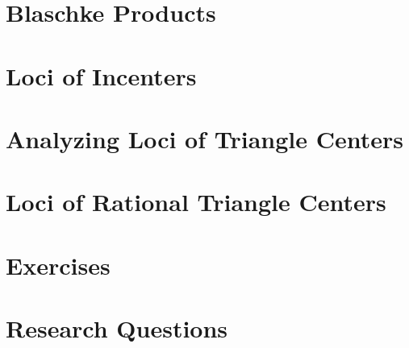 %

\section{Blaschke Products}
\label{sec:04-blaschke}


\section{Loci of Incenters}
\label{sec:04-proof_theorem}


\section{Analyzing Loci of Triangle Centers}
\label{sec:04-loci}


\section{Loci of Rational Triangle Centers}
\label{sec:04-rational-trilinears}


\section{Exercises}
\label{sec:04-exercises}


\section{Research Questions}
\label{sec:04-research}
